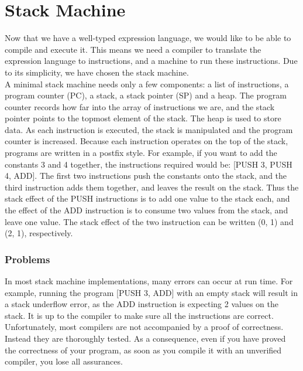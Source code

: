\section{Stack Machine}
\label{sec:stack-machine}


Now that we have a well-typed expression language, we would like to be able to compile and execute it. This means we need a compiler to translate the expression language to instructions, and a machine to run these instructions. Due to its simplicity, we have chosen the stack machine.
\\
A minimal stack machine needs only a few components: a list of instructions, a program counter (PC), a stack, a stack pointer (SP) and a heap. The program counter records how far into the array of instructions we are, and the stack pointer points to the topmost element of the stack. The heap is used to store data. As each instruction is executed, the stack is manipulated and the program counter is increased. Because each instruction operates on the top of the stack, programs are written in a postfix style. For example, if you want to add the constants 3 and 4 together, the instructions required would be: [PUSH 3, PUSH 4, ADD]. The first two instructions push the constants onto the stack, and the third instruction adds them together, and leaves the result on the stack. Thus the stack effect of the PUSH instructions is to add one value to the stack each, and the effect of the ADD instruction is to consume two values from the stack, and leave one value. The stack effect of the two instruction can be written (0, 1) and (2, 1), respectively.

\subsubsection{Problems}
In most stack machine implementations, many errors can occur at run time. For example, running the program [PUSH 3, ADD] with an empty stack will result in a stack underflow error, as the ADD instruction is expecting 2 values on the stack. It is up to the compiler to make sure all the instructions are correct. Unfortunately, most compilers are not accompanied by a proof of correctness. Instead they are thoroughly tested. As a consequence, even if you have proved the correctness of your program, as soon as you compile it with an unverified compiler, you lose all assurances. \cite{Leroy_formalverification}

